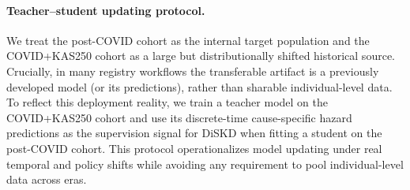 \documentclass{article}
\theoremstyle{plain}
\theoremstyle{definition}
\theoremstyle{remark}
\begin{document}

\paragraph{Teacher--student updating protocol.}
We treat the post-COVID cohort as the internal target population and the COVID+KAS250 cohort as a large but distributionally shifted historical source.
Crucially, in many registry workflows the transferable artifact is a previously developed model (or its predictions), rather than sharable individual-level data.
To reflect this deployment reality, we train a teacher model on the COVID+KAS250 cohort and use its discrete-time cause-specific hazard predictions as the supervision signal for DiSKD when fitting a student on the post-COVID cohort.
This protocol operationalizes model updating under real temporal and policy shifts while avoiding any requirement to pool individual-level data across eras.



\end{document}
